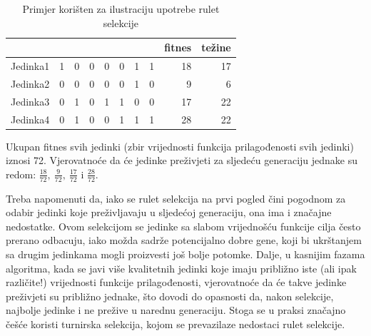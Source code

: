 \documentclass[a4paper, utf8, 11pt, colorlinks]{book}
\begin{document}
\begin{table}
	\centering
	\begin{tabular}{l|rrrrrrrrr}
		& \multicolumn{1}{l}{} & \multicolumn{1}{l}{} & \multicolumn{1}{l}{} & \multicolumn{1}{l}{} & \multicolumn{1}{l}{} & \multicolumn{1}{l}{} & \multicolumn{1}{l}{} & \multicolumn{1}{l}{fitnes} & \multicolumn{1}{l}{težine}  \\\hline
		Jedinka1 & 1                    & 0                    & 0                    & 0                    & 0                    & 1                    & 1                    & 18                         & 17                          \\
		Jedinka2 & 0                    & 0                    & 0                    & 0                    & 0                    & 1                    & 0                    & 9                          & 6                           \\
		Jedinka3 & 0                    & 1                    & 0                    & 1                    & 1                    & 0                    & 0                    & 17                         & 22                          \\
		Jedinka4 & 0                    & 1                    & 0                    & 0                    & 1                    & 1                    & 1                    & 28                         & 22      \\\hline                   
	\end{tabular}\caption{Primjer korišten za ilustraciju upotrebe rulet selekcije}
	\label{tab:rulet}
\end{table}
Ukupan fitnes svih jedinki (zbir vrijednosti funkcija prilagođenosti svih jedinki) iznosi 72. Vjerovatnoće da će jedinke preživjeti za sljedeću generaciju jednake su redom: $\frac{18}{72},\ \frac{9}{72},\ \frac{17}{72}$ i $\frac{28}{72}$. 

Treba napomenuti da, iako se rulet selekcija na prvi pogled čini pogodnom za odabir jedinki koje preživljavaju u sljedećoj generaciju, ona ima i značajne nedostatke. Ovom selekcijom se jedinke sa slabom vrijednošću funkcije cilja često prerano odbacuju, iako možda sadrže potencijalno dobre gene, koji bi ukrštanjem sa drugim jedinkama mogli proizvesti još bolje potomke. Dalje, u kasnijim fazama algoritma, kada se javi više kvalitetnih jedinki koje imaju približno iste (ali ipak različite!) vrijednosti funkcije prilagođenosti, vjerovatnoće da će takve jedinke preživjeti su približno jednake, što dovodi do opasnosti da, nakon selekcije, najbolje jedinke i ne prežive u narednu generaciju. Stoga se u praksi značajno češće koristi turnirska selekcija, kojom se prevazilaze nedostaci rulet selekcije.
\end{document}
